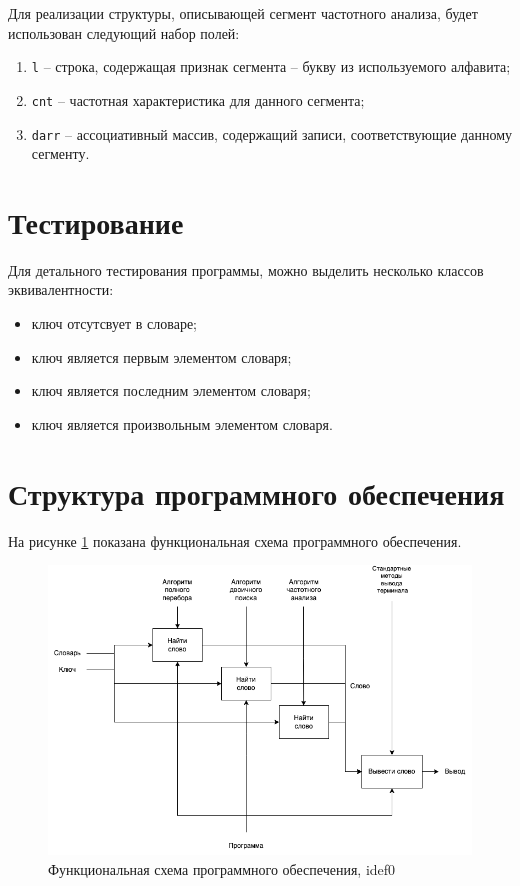 \documentclass[12pt]{report}
\begin{document}
	Для реализации структуры, описывающей сегмент частотного анализа, будет использован следующий набор полей:
	\begin{enumerate}
		\item \texttt{l} -- строка, содержащая признак сегмента -- букву из используемого алфавита;
		\item \texttt{cnt} -- частотная характеристика для данного сегмента;
		\item \texttt{darr} -- ассоциативный массив, содержащий записи, соответствующие данному сегменту.
	\end{enumerate}
	
	\section{Тестирование}
	Для детального тестирования программы, можно выделить несколько классов эквивалентности:
	\begin{itemize}
		\item ключ отсутсвует в словаре;
		\item ключ является первым элементом словаря;
		\item ключ является последним элементом словаря;
		\item ключ является произвольным элементом словаря.
	\end{itemize}
	
	\section{Структура программного обеспечения}
	На рисунке \ref{fig:idef0} показана функциональная схема программного обеспечения.
	
	\begin{figure}[H]
		\begin{center}
			\includegraphics[scale=0.5]{img/idef0.png}
			\caption{Функциональная схема программного обеспечения, idef0}
			\label{fig:idef0}
		\end{center}
	\end{figure}
	
\end{document}

